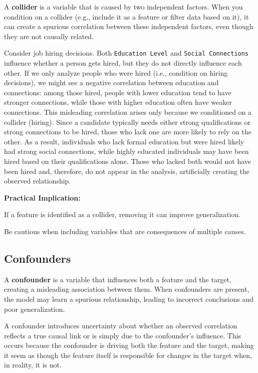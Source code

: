 \documentclass[12pt,openany]{book}
\begin{document}
A \textbf{collider} is a variable that is caused by two independent factors. When you condition on a collider (e.g., include it as a feature or filter data based on it), it can create a spurious correlation between these independent factors, even though they are not causally related.

\begin{examplebox}
Consider job hiring decisions. Both \texttt{Education Level} and \texttt{Social Connections} influence whether a person gets hired, but they do not directly influence each other. If we only analyze people who were hired (i.e., condition on hiring decisions), we might see a negative correlation between education and connections: among those hired, people with lower education tend to have stronger connections, while those with higher education often have weaker connections. This misleading correlation arises only because we conditioned on a collider (hiring). Since a candidate typically needs either strong qualifications or strong connections to be hired, those who lack one are more likely to rely on the other. As a result, individuals who lack formal education but were hired likely had strong social connections, while highly educated individuals may have been hired based on their qualifications alone. Those who lacked both would not have been hired and, therefore, do not appear in the analysis, artificially creating the observed relationship.
\end{examplebox}

\textbf{Practical Implication:}

If a feature is identified as a collider, removing it can improve generalization.

Be cautious when including variables that are consequences of multiple causes.

\subsection{Confounders}

A \textbf{confounder} is a variable that influences both a feature and the target, creating a misleading association between them. When confounders are present, the model may learn a spurious relationship, leading to incorrect conclusions and poor generalization.
\newline

A confounder introduces uncertainty about whether an observed correlation reflects a true causal link or is simply due to the confounder’s influence. This occurs because the confounder is driving both the feature and the target, making it seem as though the feature itself is responsible for changes in the target when, in reality, it is not.
\end{document}
